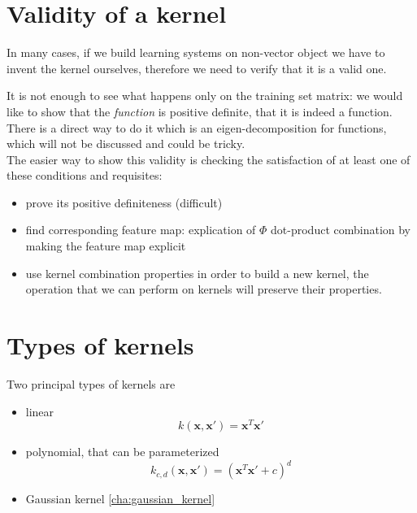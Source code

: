 \section{Validity of a kernel}
    In many cases, if we build learning systems on non-vector object we have to invent the kernel ourselves, therefore we need to verify that it is a valid one. 
    
    
    
    It is not enough to see what happens only on the training set matrix: we would like to show that the \textit{function} is positive definite, that it is indeed a function.
    There is a direct way to do it which is an eigen-decomposition for functions, which will not be discussed and could be tricky.\\
    
    The easier way to show this validity is checking the satisfaction of at least one of these conditions and requisites:
    \begin{itemize}
        \item prove its positive definiteness (difficult)
        \item find corresponding feature map: explication of $\Phi$ dot-product combination by making the feature map explicit
        \item use kernel combination properties in order to build a new kernel, the operation that we can perform on kernels will preserve their properties.
    \end{itemize}

\section{Types of kernels}
    Two principal types of kernels are 
    \begin{itemize}
        \item linear $$k(\pmb{x}, \pmb{x}') = \pmb{x}^T \pmb{x}'$$
        \item polynomial, that can be parameterized 
        $$k_{c, d} (\pmb{x}, \pmb{x}') = (\pmb{x}^T \pmb{x}' + c) ^d$$
        \item Gaussian kernel \ref{cha:gaussian_kernel}
    \end{itemize}

